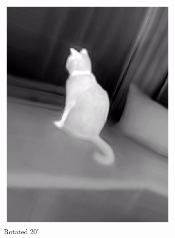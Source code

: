 \documentclass{l4proj}
\begin{document}
\begin{figure}[ht]
\begin{subfigure}[h!]{0.24\textwidth}
    \includegraphics[width=\textwidth]{images/augmentation/rotated.png}
    \caption{Rotated $20^{\circ}$}
  \end{subfigure}
  \begin{subfigure}[h!]{0.24\textwidth}

\end{subfigure}
\end{figure}
\end{document}

